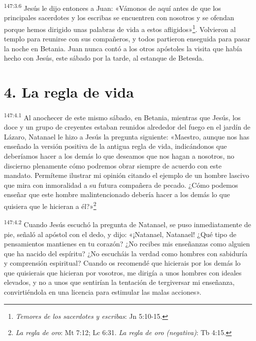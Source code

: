 \par 
\textsuperscript{147:3.6} Jesús le dijo entonces a Juan: «Vámonos de aquí antes de que los principales sacerdotes y los escribas se encuentren con nosotros y se ofendan porque hemos dirigido unas palabras de vida a estos afligidos»\footnote{\textit{Temores de los sacerdotes y escribas}: Jn 5:10-15.}. Volvieron al templo para reunirse con sus compañeros, y todos partieron enseguida para pasar la noche en Betania. Juan nunca contó a los otros apóstoles la visita que había hecho con Jesús, este sábado por la tarde, al estanque de Betesda.

\section*{4. La regla de vida}
\par 
\textsuperscript{147:4.1} Al anochecer de este mismo sábado, en Betania, mientras que Jesús, los doce y un grupo de creyentes estaban reunidos alrededor del fuego en el jardín de Lázaro, Natanael le hizo a Jesús la pregunta siguiente: «Maestro, aunque nos has enseñado la versión positiva de la antigua regla de vida, indicándonos que deberíamos hacer a los demás lo que deseamos que nos hagan a nosotros, no discierno plenamente cómo podremos obrar siempre de acuerdo con este mandato. Permíteme ilustrar mi opinión citando el ejemplo de un hombre lascivo que mira con inmoralidad a su futura compañera de pecado. ¿Cómo podemos enseñar que este hombre malintencionado debería hacer a los demás lo que quisiera que le hicieran a él?»\footnote{\textit{La regla de oro}: Mt 7:12; Lc 6:31. \textit{La regla de oro (negativa)}: Tb 4:15.}

\par 
\textsuperscript{147:4.2} Cuando Jesús escuchó la pregunta de Natanael, se puso inmediatamente de pie, señaló al apóstol con el dedo, y dijo: «¡Natanael, Natanael! ¿Qué tipo de pensamientos mantienes en tu corazón? ¿No recibes mis enseñanzas como alguien que ha nacido del espíritu? ¿No escucháis la verdad como hombres con sabiduría y comprensión espiritual? Cuando os recomendé que hicierais por los demás lo que quisierais que hicieran por vosotros, me dirigía a unos hombres con ideales elevados, y no a unos que sentirían la tentación de tergiversar mi enseñanza, convirtiéndola en una licencia para estimular las malas acciones».


